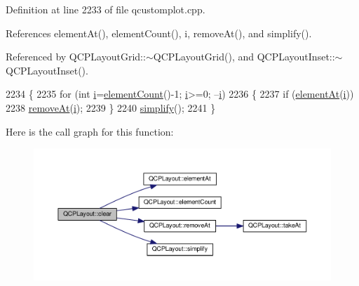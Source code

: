 Definition at line 2233 of file qcustomplot.\+cpp.



References element\+At(), element\+Count(), i, remove\+At(), and simplify().



Referenced by Q\+C\+P\+Layout\+Grid\+::$\sim$\+Q\+C\+P\+Layout\+Grid(), and Q\+C\+P\+Layout\+Inset\+::$\sim$\+Q\+C\+P\+Layout\+Inset().


\begin{DoxyCode}
2234 \{
2235   \textcolor{keywordflow}{for} (\textcolor{keywordtype}{int} \hyperlink{_comparision_pictures_2_createtest_image_8m_a6f6ccfcf58b31cb6412107d9d5281426}{i}=\hyperlink{class_q_c_p_layout_a39d3e9ef5d9b82ab1885ba1cb9597e56}{elementCount}()-1; \hyperlink{_comparision_pictures_2_createtest_image_8m_a6f6ccfcf58b31cb6412107d9d5281426}{i}>=0; --\hyperlink{_comparision_pictures_2_createtest_image_8m_a6f6ccfcf58b31cb6412107d9d5281426}{i})
2236   \{
2237     \textcolor{keywordflow}{if} (\hyperlink{class_q_c_p_layout_afa73ca7d859f8a3ee5c73c9b353d2a56}{elementAt}(\hyperlink{_comparision_pictures_2_createtest_image_8m_a6f6ccfcf58b31cb6412107d9d5281426}{i}))
2238       \hyperlink{class_q_c_p_layout_a2403f684fee3ce47132faaeed00bb066}{removeAt}(\hyperlink{_comparision_pictures_2_createtest_image_8m_a6f6ccfcf58b31cb6412107d9d5281426}{i});
2239   \}
2240   \hyperlink{class_q_c_p_layout_a41e6ac049143866e8f8b4964efab01b2}{simplify}();
2241 \}
\end{DoxyCode}


Here is the call graph for this function\+:\nopagebreak
\begin{figure}[H]
\begin{center}
\leavevmode
\includegraphics[width=350pt]{class_q_c_p_layout_a02883bdf2769b5b227f0232dba1ac4ee_cgraph}
\end{center}
\end{figure}





